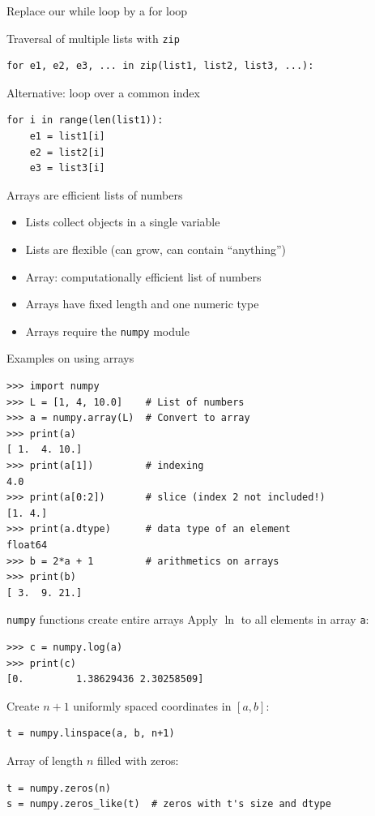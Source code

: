 \begin{frame}[fragile]{Replace our while loop by a for loop}

\end{frame}

\begin{frame}[fragile]{Traversal of multiple lists with \texttt{zip}}
\begin{lstlisting}[style=pythoncompact]
for e1, e2, e3, ... in zip(list1, list2, list3, ...):
\end{lstlisting}
  Alternative: loop over a common index
\begin{lstlisting}[style=pythoncompact]
for i in range(len(list1)):
    e1 = list1[i]
    e2 = list2[i]
    e3 = list3[i]
\end{lstlisting}
\end{frame}

\begin{frame}{Arrays are efficient lists of numbers}
  \begin{itemize}
    \item Lists collect objects in a single variable
    \item Lists are flexible (can grow, can contain ``anything'')
    \item Array: computationally efficient list of numbers
    \item Arrays have fixed length and one numeric type
    \item Arrays require the \texttt{numpy} module
  \end{itemize}
\end{frame}

\begin{frame}[fragile]{Examples on using arrays}
\begin{lstlisting}[style=pythonTiny]
>>> import numpy
>>> L = [1, 4, 10.0]    # List of numbers
>>> a = numpy.array(L)  # Convert to array
>>> print(a)
[ 1.  4. 10.]
>>> print(a[1])         # indexing
4.0
>>> print(a[0:2])       # slice (index 2 not included!)
[1. 4.]
>>> print(a.dtype)      # data type of an element
float64
>>> b = 2*a + 1         # arithmetics on arrays
>>> print(b)
[ 3.  9. 21.]
\end{lstlisting}
\end{frame}

\begin{frame}[fragile]{\texttt{numpy} functions create entire arrays}
  Apply $\ln$ to all elements in array \texttt{a}:
\begin{lstlisting}[style=pythoncompact]
>>> c = numpy.log(a)
>>> print(c)
[0.         1.38629436 2.30258509]
\end{lstlisting}
  Create $n+1$ uniformly spaced coordinates in $[a,b]$:
\begin{lstlisting}[style=pythoncompact]
t = numpy.linspace(a, b, n+1)
\end{lstlisting}
  Array of length $n$ filled with zeros:
\begin{lstlisting}[style=pythoncompact]
t = numpy.zeros(n)
s = numpy.zeros_like(t)  # zeros with t's size and dtype
\end{lstlisting}
\end{frame}

